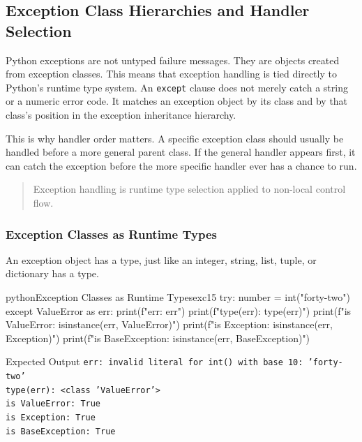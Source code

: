 \subsection{Exception Class Hierarchies and Handler Selection}

Python exceptions are not untyped failure messages. They are objects created from exception classes. This means that exception handling is tied directly to Python's runtime type system. An \texttt{except} clause does not merely catch a string or a numeric error code. It matches an exception object by its class and by that class's position in the exception inheritance hierarchy.

This is why handler order matters. A specific exception class should usually be handled before a more general parent class. If the general handler appears first, it can catch the exception before the more specific handler ever has a chance to run.

\begin{quote}
Exception handling is runtime type selection applied to non-local control flow.
\end{quote}

\subsubsection{Exception Classes as Runtime Types}

An exception object has a type, just like an integer, string, list, tuple, or dictionary has a type.

\begin{codebox}[]{python}{Exception Classes as Runtime Types}{exc15}
try:
    number = int("forty-two")
except ValueError as err:
    print(f"err: {err}")
    print(f"type(err): {type(err)}")
    print(f"is ValueError: {isinstance(err, ValueError)}")
    print(f"is Exception: {isinstance(err, Exception)}")
    print(f"is BaseException: {isinstance(err, BaseException)}")
\end{codebox}


\begin{iobox}{Expected Output}
\texttt{err: invalid literal for int() with base 10: 'forty-two'} \\
\texttt{type(err): <class 'ValueError'>} \\
\texttt{is ValueError: True} \\
\texttt{is Exception: True} \\
\texttt{is BaseException: True} \\
\end{iobox}



